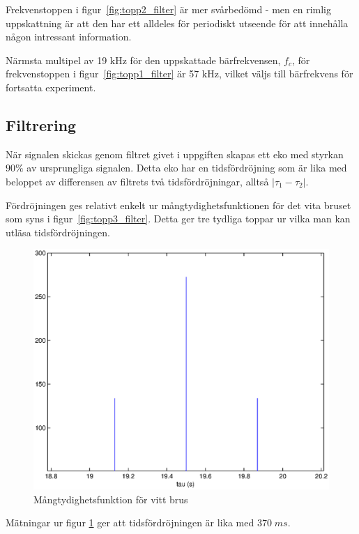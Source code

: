 \documentclass[10pt,twocolumn]{article}
\begin{document}
Frekvenstoppen i figur~\ref{fig:topp2_filter} är mer svårbedömd - men en rimlig uppskattning är att den har ett alldeles för periodiskt utseende för att innehålla någon intressant information. 

Närmsta multipel av 19 kHz för den uppskattade bärfrekvensen, $f_c$, för frekvenstoppen i figur~\ref{fig:topp1_filter} är 57 kHz, vilket väljs till bärfrekvens för fortsatta experiment. 

\subsection{Filtrering}

När signalen skickas genom filtret givet i uppgiften skapas ett eko med styrkan $90\%$ av ursprungliga signalen. Detta eko har en tidsfördröjning som är lika med beloppet av differensen av filtrets två tidsfördröjningar, alltså $|\tau_1 - \tau_2|$.

Fördröjningen ges relativt enkelt ur mångtydighetsfunktionen för det vita bruset som syns i figur~\ref{fig:topp3_filter}. Detta ger tre tydliga toppar ur vilka man kan utläsa tidsfördröjningen. 
\begin{figure}[htp]
  \begin{center}
  \includegraphics[keepaspectratio=true,width=\linewidth]{xCorr.eps}  %
  \end{center}
  \caption{Mångtydighetsfunktion för vitt brus} %
  \label{fig:xCorr}
\end{figure}
Mätningar ur figur \ref{fig:xCorr} ger att tidsfördröjningen är lika med $370\;ms$. 
\end{document}
